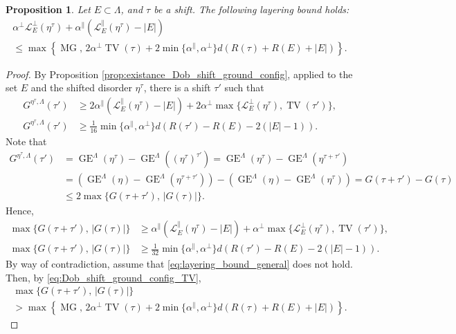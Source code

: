 \documentclass[11pt, reqno]{amsart}
\newtheorem{proposition}[theorem]{Proposition}
\DeclareMathOperator{\GE}{GE}
\DeclareMathOperator{\TV}{TV}
\DeclareMathOperator{\MG}{MG}
\numberwithin{equation}{section}
\begin{document}
\begin{proposition}\label{prop:general_shift_functions_layering}
Let $E\subset \Lambda$, and $\tau$ be a shift. The following layering bound holds:
\begin{multline}
\label{eq:layering_bound_general}
\alpha^{\perp}\mathcal{L}^{\perp}_{E}(\eta^{\tau})+ \alpha^{\parallel} \left( \mathcal{L}^{\parallel}_{E}(\eta^{\tau}) -|E| \right) \\
\leq \max\left\{  \MG,\, 2\alpha^{\perp}\TV\left(\tau\right)+2\min \{ \alpha^{\parallel}, \alpha^{\perp} \}d\left(R(\tau)+R\left(E\right)+\left|E\right|\right)\right\}. 
\end{multline}
\end{proposition}
\begin{proof}
By Proposition \ref{prop:existance_Dob_shift_ground_config}, applied to the set $E$ and the shifted disorder $\eta^{\tau}$, there is a shift $\tau'$ such that
\begin{align*}
G^{\eta^{\tau},\Lambda}(\tau')
&\geq    
2\alpha^{\parallel} \left( \mathcal{L}^{\parallel}_E(\eta^{\tau})-|E|\right)+2\alpha^{\perp}\max\{\mathcal{L}^{\perp}_{E}(\eta^{\tau}),\TV(\tau')\},\\  
G^{\eta^{\tau},\Lambda}(\tau')
&\geq \frac{1}{16}\min\{\alpha^{\parallel},\alpha^{\perp}\}d\left(R(\tau')-R(E)-2(|E|-1)\right).
\end{align*}
Note that 
\begin{align*}
G^{\eta^{\tau},\Lambda}(\tau')&= \GE^{\Lambda}(\eta^{\tau}) - \GE^{\Lambda}\left((\eta^{\tau})^{\tau'}\right)=\GE^{\Lambda}(\eta^{\tau})- \GE^{\Lambda}(\eta^{\tau+\tau'})\\
&= \left(\GE^{\Lambda}(\eta)- \GE^{\Lambda}(\eta^{\tau+\tau'})\right)-\left(\GE^{\Lambda}(\eta) - \GE^{\Lambda}(\eta^{\tau})\right)=
G(\tau+\tau')-G(\tau)\\
&\leq 2\max\{G(\tau+\tau'),\,\lvert G(\tau)\rvert\}.
\end{align*}
Hence,
\begin{align}
\max\{G(\tau+\tau'),\,\lvert G(\tau)\rvert\}&
\geq \alpha^{\parallel} \left( \mathcal{L}^{\parallel}_E(\eta^{\tau})-|E|\right)+\alpha^{\perp}\max\{\mathcal{L}^{\perp}_{E}(\eta^{\tau}),\TV(\tau')\},\label{eq:Dob_shift_ground_config_TV}\\  
\max\{G(\tau+\tau'),\,\lvert G(\tau)\rvert\}&\geq \frac{1}{32}\min\{\alpha^{\parallel},\alpha^{\perp}\}d\left(R(\tau')-R(E)-2(|E|-1)\right).
\label{eq:Dob_shift_ground_config_R}\end{align}
By way of contradiction, assume that \eqref{eq:layering_bound_general} does not hold. Then, by \eqref{eq:Dob_shift_ground_config_TV},
\begin{multline}
\label{eq:Dob_shift_ground_config_TV_0}
\max\{G(\tau+\tau'),\,\lvert G(\tau)\rvert\} \\
>\max\left\{  \MG,\, 2\alpha^{\perp}\TV\left(\tau\right)+2\min \{ \alpha^{\parallel}, \alpha^{\perp} \}d\left(R(\tau)+R\left(E\right)+\left|E\right|\right)\right\}.
\end{multline}


\end{proof}
\end{document}
